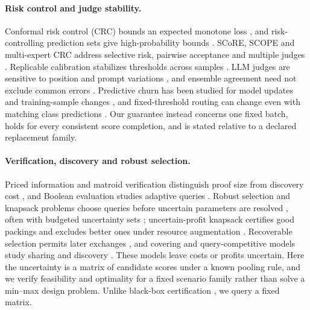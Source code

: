 \documentclass[11pt]{article}
\begin{document}
\paragraph{Risk control and judge stability.} Conformal risk control (CRC) bounds an expected monotone loss \citep{angelopoulos2024crc,yeh2025crt}, and risk-controlling prediction sets give high-probability bounds \citep{bates2021rcps}. SCoRE, SCOPE and multi-expert CRC address selective risk, pairwise acceptance and multiple judges \citep{bai2026score,badshah2026scope,cheng2026multiexpert}. Replicable calibration stabilizes thresholds across samples \citep{papamichalis2026replicable}. LLM judges are sensitive to position and prompt variations \citep{wang2024fair,thakur2024judges}, and ensemble agreement need not exclude common errors \citep{afrin2026ensembles}. Predictive churn has been studied for model updates and training-sample changes \citep{milanifard2016churn,watsondaniels2025churn,prastalo2026churn}, and fixed-threshold routing can change even with matching class predictions \citep{kim2026lottery}. Our guarantee instead concerns one fixed batch, holds for every consistent score completion, and is stated relative to a declared replacement family.

\paragraph{Verification, discovery and robust selection.} Priced information and matroid verification distinguish proof size from discovery cost \citep{charikar2002priced,diwan2026matroid}, and Boolean evaluation studies adaptive queries \citep{deshpande2016submodular,gkenosis2018scoreclassification}. Robust selection and knapsack problems choose queries before uncertain parameters are resolved \citep{chen2026robustselection,goerigk2015knapsack}, often with budgeted uncertainty sets \citep{bertsimas2004price}; uncertain-profit knapsack certifies good packings and excludes better ones under resource augmentation \citep{schloter2025knapsack}. Recoverable selection permits later exchanges \citep{chassein2018recoverable}, and covering and query-competitive models study sharing and discovery \citep{megow2023covering,erlebach2015querycompetitive,erlebach2021parallel}. These models leave costs or profits uncertain. Here the uncertainty is a matrix of candidate scores under a known pooling rule, and we verify feasibility and optimality for a fixed scenario family rather than solve a min--max design problem. Unlike black-box certification \citep{blanc2022certification,gupta2023monotone}, we query a fixed matrix.
\end{document}
